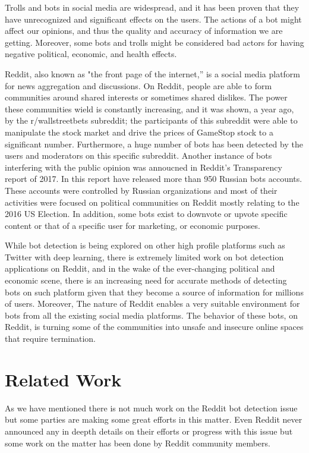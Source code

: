 \documentclass{article}
\begin{document}
Trolls and bots in social media are widespread, and it has been proven that they have unrecognized and significant effects on the users. The actions of a bot might affect our opinions, and thus the quality and accuracy of information we are getting. Moreover, some bots and trolls might be considered bad actors for having negative political, economic, and health effects. \par
Reddit, also known as "the front page of the internet,” is a social media platform for news aggregation and discussions. On Reddit, people are able to form communities around shared interests or sometimes shared dislikes. The power these communities wield is constantly increasing, and it was shown, a year ago, by the r/wallstreetbets subreddit; the participants of this subreddit were able to manipulate the stock market and drive the prices of GameStop stock to a significant number.  Furthermore,  a huge number of bots has been detected by the users and moderators on this specific subreddit. Another instance of bots interfering with the public opinion was annoucned in Reddit's Transparency report of 2017.  In this report have released more than 950 Russian bots accounts. These accounts were controlled by Russian organizations and most of their activities were focused on political communities on Reddit mostly relating to the 2016 US Election. In addition, some bots exist to downvote or upvote specific content or that of a specific user for marketing, or economic purposes. \par
While bot detection is being explored on other high profile platforms such as Twitter with deep learning, there is extremely limited work on bot detection applications on Reddit, and in the wake of the ever-changing political and economic scene, there is an increasing need for accurate methods of detecting bots on such platform given that they become a source of information for millions of users. Moreover, The nature of Reddit enables a very suitable environment for bots from all the existing social media platforms. The behavior of these bots, on Reddit, is turning some of the communities into unsafe and insecure online spaces that require termination.

\section{Related Work}
    As we have mentioned there is not much work on the Reddit bot detection issue but some parties are making some great efforts in this matter. Even Reddit never announced any in deepth details on their efforts or progress with this issue but some work on the matter has been done by Reddit community members.\par
    
\end{document}
